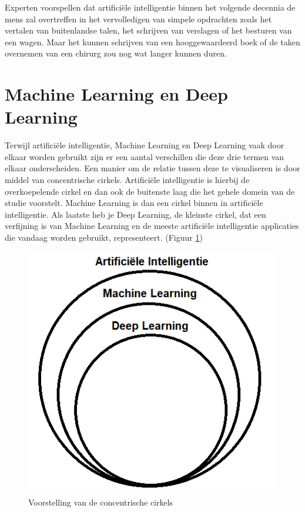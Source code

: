 Experten voorspellen dat artificiële intelligentie binnen het volgende decennia de mens zal overtreffen in het vervolledigen van simpele opdrachten zoals het vertalen van buitenlandse talen, het schrijven van verslagen of het besturen van een wagen. Maar het kunnen schrijven van een hooggewaardeerd boek of de taken overnemen van een chirurg zou nog wat langer kunnen duren. \autocite{Katja2018}



\section{Machine Learning en Deep Learning}

Terwijl artificiële intelligentie, Machine Learning en Deep Learning vaak door elkaar worden gebruikt zijn er een aantal verschillen die deze drie termen van elkaar onderscheiden. Een manier om de relatie tussen deze te visualiseren is door middel van concentrische cirkels.
Artificiële intelligentie is hierbij de overkoepelende cirkel en dan ook de buitenste laag die het gehele domein van de studie voorstelt. Machine Learning is dan een cirkel binnen in artificiële intelligentie. Als laatste heb je Deep Learning, de kleinste cirkel, dat een verfijning is van Machine Learning en de meeste artificiële intelligentie applicaties die vandaag worden gebruikt, representeert. (Figuur \ref{tab:cirkels})

\begin{figure}
    \centering
    
    \includegraphics[scale=0.6]{img/cirkels.png}
    \caption{Voorstelling van de concentrische cirkels}
    \label{tab:cirkels}
\end{figure}

